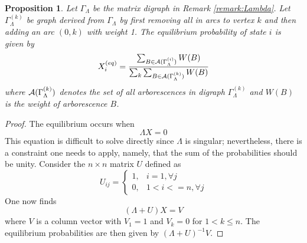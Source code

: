 \documentclass{article}
\newtheorem{proposition}{Proposition}
\begin{document}
\begin{proposition}
    Let $\Gamma_\Lambda$ be the matrix digraph in Remark \ref{remark:Lambda}.  Let $\Gamma_\Lambda^{(k)}$ be graph derived from $\Gamma_\Lambda$ by first removing all in arcs to vertex $k$ and then adding an arc $(0, k)$ with weight 1. The equilibrium probability of state $i$ is given by
    \begin{equation}
    X_i^{(eq)} = \frac{\sum_{B \in {\cal A}(\Gamma_\Lambda^{(i)})}W(B)}{\sum_k \sum_{B \in {\cal A}(\Gamma_\Lambda^{(k)})} W(B)}
    \end{equation}
    where ${\cal A}(\Gamma_\Lambda^{(k)})$ denotes the set of all arborescences in digraph $\Gamma_\Lambda^{(k)}$ and $W(B)$ is the weight of arborescence $B$.
    \label{prop:equil}
\end{proposition}
\begin{proof}
The equilibrium occurs when
\begin{equation}
    \Lambda X = 0
    \label{eq:equil}
\end{equation}
This equation is difficult to solve directly since $\Lambda$ is singular; nevertheless, there is a constraint one needs to apply, namely, that the sum of the probabilities should be unity.  Consider the $n \times n$ matrix $U$ defined as
\begin{equation}
U_{ij} = 
\begin{cases}
1, & i = 1, \forall j\\
0, & 1 < i <= n, \forall j
\end{cases}
\label{eq:U_elements}
\end{equation}
One now finds
\begin{equation}
    \left(\Lambda + U\right)X = V
    \label{eq:U_equil}
\end{equation}
where $V$ is a column vector with $V_1 = 1$ and $V_k = 0$ for $1 < k \leq n$.  The equilibrium probabilities are then given by $\left(\Lambda + U\right)^{-1} V$.


\end{proof}
\end{document}

